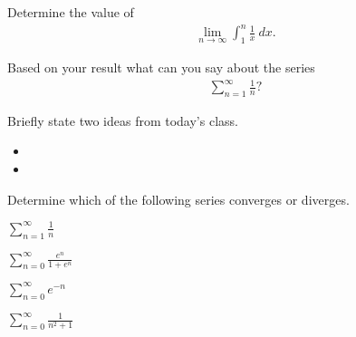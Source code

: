 \begin{problem}
\clearpage

\item Determine the value of
  \begin{eqnarray*}
    \lim_{n\rightarrow\infty} \int_1^n \frac{1}{x} ~ dx.
  \end{eqnarray*}
  \vfill

\item Based on your result what can you say about the series
  \begin{eqnarray*}
    \sum_{n=1}^\infty \frac{1}{n}?
  \end{eqnarray*}
  \vfill

\end{problem}


\postClass

\begin{problem}
\item Briefly state two ideas from today's class.
  \begin{itemize}
  \item
  \item
  \end{itemize}
\item Determine which of the following series converges or
  diverges.
  \begin{subproblem}
    \item $\sum_{n=1}^\infty \frac{1}{n}$
      \vfill
    \item $\sum_{n=0}^\infty \frac{e^n}{1+e^n}$
      \vfill
      \clearpage
    \item $\sum_{n=0}^\infty e^{-n}$
      \vfill
    \item $\sum_{n=0}^\infty \frac{1}{n^2+1}$
      \vfill
  \end{subproblem}
\end{problem}



